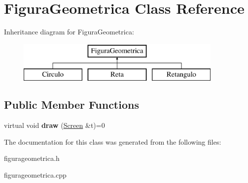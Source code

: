 \hypertarget{class_figura_geometrica}{}\section{Figura\+Geometrica Class Reference}
\label{class_figura_geometrica}
Inheritance diagram for Figura\+Geometrica\+:\begin{figure}[H]
\begin{center}
\leavevmode
\includegraphics[height=2.000000cm]{class_figura_geometrica}
\end{center}
\end{figure}
\subsection*{Public Member Functions}
\begin{DoxyCompactItemize}
\item 
\mbox{\label{class_figura_geometrica_a8ee8dedc060b6059a805ea091aef2c41}} 
virtual void {\bfseries draw} (\mbox{\hyperlink{class_screen}{Screen}} \&t)=0
\end{DoxyCompactItemize}


The documentation for this class was generated from the following files\+:\begin{DoxyCompactItemize}
\item 
figurageometrica.\+h\item 
figurageometrica.\+cpp\end{DoxyCompactItemize}
